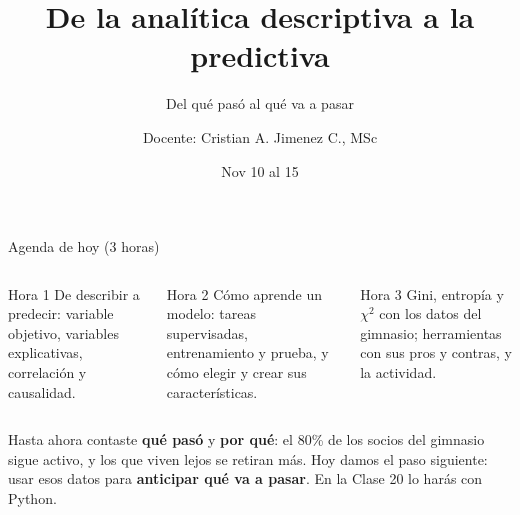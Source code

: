 \documentclass[aspectratio=169,11pt]{beamer}
\title{De la analítica descriptiva a la predictiva}
\subtitle{Del qué pasó al qué va a pasar}
\author{Docente: Cristian A. Jimenez C., MSc}
\date{Nov 10 al 15}
\begin{document}
{
\begin{frame}
  \titlepage
\end{frame}
}

\begin{frame}[t]{Agenda de hoy (3 horas)}
  \begin{columns}[T,onlytextwidth]
    \begin{block}{Hora 1}
      \small De describir a predecir: variable objetivo, variables
      explicativas, correlación y causalidad.
    \end{block}
    \begin{block}{Hora 2}
      \small Cómo aprende un modelo: tareas supervisadas, entrenamiento y
      prueba, y cómo elegir y crear sus características.
    \end{block}
    \begin{block}{Hora 3}
      \small Gini, entropía y $\chi^2$ con los datos del gimnasio;
      herramientas con sus pros y contras, y la actividad.
    \end{block}
  \end{columns}
  \vspace{0.3cm}
  \small Hasta ahora contaste \textbf{qué pasó} y \textbf{por qué}: el 80\%
  de los socios del gimnasio sigue activo, y los que viven lejos se retiran
  más. Hoy damos el paso siguiente: usar esos datos para \textbf{anticipar
  qué va a pasar}. En la Clase 20 lo harás con Python.
\end{frame}
\end{document}
